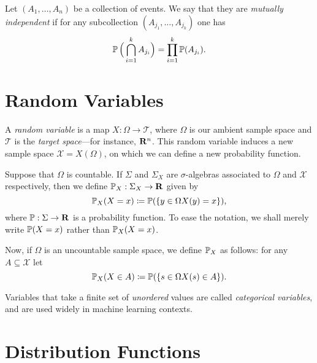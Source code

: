 \begin{definition}
    \label{def:mutually-independent-events}
    Let \((A_1, \dots, A_n)\) be a collection of events. We say that they are
    \emph{mutually independent} if for any subcollection \((A_{j_1}, \dots,
    A_{j_k})\) one has
    \[
        \operatorname{\mathbb{P}} \Big(\bigcap_{i=1}^k A_{j_i}\Big) = \prod_{i=1}^k \operatorname{\mathbb{P}}(A_{j_i}).
    \]
\end{definition}

\section{Random Variables}

\begin{definition}
    \label{def:random-variable}
    A \emph{random variable} is a map \(X: \Omega \to \mathcal{T}\), where
    \(\Omega\) is our ambient sample space and \(\mathcal{T}\) is the \emph{target
        space}---for instance, \(\mathbf{R}^n\). This random variable induces a new sample space
    \(\mathcal{X} = X(\Omega)\), on which we can define a new probability function.

    Suppose that \(\Omega\) is countable. If \(\Sigma\) and \(\Sigma_X\) are
    \(\sigma\)-algebras associated to \(\Omega\) and \(\mathcal{X}\) respectively,
    then we define \(\operatorname{\mathbb{P}}_X: \Sigma_X \to \mathbf{R}\) given by
    \[
        \operatorname{\mathbb{P}}_X(X = x) \coloneq \operatorname{\mathbb{P}}(\{y \in \Omega \relax X(y) = x\}),
    \]
    where \(\operatorname{\mathbb{P}}: \Sigma \to \mathbf{R}\) is a probability function. To ease the notation,
    we shall merely write \(\operatorname{\mathbb{P}}(X = x)\) rather than \(\operatorname{\mathbb{P}}_X(X = x)\).

    Now, if \(\Omega\) is an uncountable sample space, we define \(\operatorname{\mathbb{P}}_X\) as
    follows: for any \(A \subseteq \mathcal{X}\) let
    \[
        \operatorname{\mathbb{P}}_X(X \in A) \coloneq \operatorname{\mathbb{P}}(\{s \in \Omega \relax X(s) \in A\}).
    \]
\end{definition}

\begin{definition}
    \label{def:categorical-variables}
    Variables that take a finite set of \emph{unordered} values are called
    \emph{categorical variables}, and are used widely in machine learning contexts.
\end{definition}

\section{Distribution Functions}

